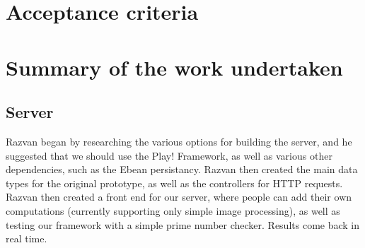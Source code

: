 \documentclass[a4paper,10pt]{article}
\begin{document}

\section{Acceptance criteria}


\section{Summary of the work undertaken}

\subsection{Server}


Razvan began by researching the various options for building the server, and he suggested that we should use the Play! Framework, as well as various other dependencies, such as the Ebean persistancy. Razvan then created the main data types for the original prototype, as well as the controllers for HTTP requests. 
Razvan then created a front end for our server, where people can add their own computations (currently supporting only simple image processing), as well as testing our framework with a simple  prime number checker. Results come back in real time.
\end{document}
